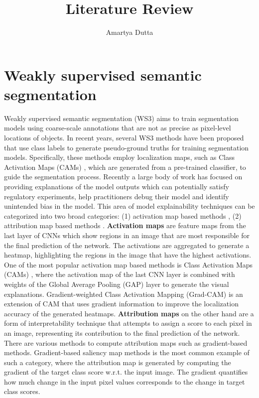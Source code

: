 \documentclass[11pt]{article}
\title{\textbf{Literature Review}}
\author{Amartya Dutta}
\date{}
\begin{document}
\clearpage\maketitle
\thispagestyle{empty}
\section{Weakly supervised semantic segmentation}
Weakly supervised semantic segmentation (WS3) aims to train segmentation models using coarse-scale annotations that are not as precise as pixel-level locations of objects. In recent years, several WS3 methods have been proposed that use class labels to generate pseudo-ground truths for training segmentation models. Specifically, these methods employ localization maps, such as Class Activation Maps (CAMs) \cite{zhou2016learning, selvaraju2016grad}, which are generated from a pre-trained classifier, to guide the segmentation process. \newline
Recently a large body of work has focused on providing explanations of the model outputs which can potentially satisfy regulatory experiments, help practitioners debug their model and identify unintended bias in the model. This area of model explainability techniques can be categorized into two broad categories: (1) activation map based methods \cite{zhou2016learning, selvaraju2016grad}, (2) attribution map based methods \cite{simonyan2013deep, baehrens2010explain}.  \newline
\textbf{Activation maps} are feature maps from the last layer of CNNs which show regions in an image that are most responsible for the final prediction of the network. The activations are aggregated to generate a heatmap, highlighting the regions in the image that have the highest activations. One of the most popular activation map based methods is Class Activation Maps (CAMs) \cite{zhou2016learning}, where the activation map of the last CNN layer is combined with weights of the Global Average Pooling (GAP) layer to generate the visual explanations. Gradient-weighted Class Activation Mapping (Grad-CAM) \cite{selvaraju2016grad} is an extension of CAM that uses gradient information to improve the localization accuracy of the generated heatmaps. \textbf{Attribution maps} on the other hand are a form of interpretability technique that attempts to assign a score to each pixel in an image, representing its contribution to the final prediction of the network. There are various methods to compute attribution maps such as gradient-based methods. Gradient-based saliency map methods \cite{simonyan2013deep,baehrens2010explain} is the most common example of such a category, where the attribution map is generated by computing the gradient of the target class score w.r.t. the input image. The gradient quantifies how much change in the input pixel values corresponds to the change in target class scores. \newline
\end{document}
